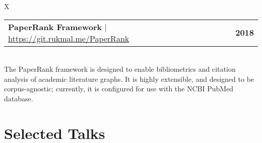 \documentclass[10pt]{article}
\newcommand{\tabularxwidth}{\textwidth}
\begin{document}
        \begin{tabularx}{\tabularxwidth}{X}
                {
                    \begin{tabularx}{\tabularxwidth}{@{}X r}
                        \textbf{PaperRank Framework}
                            | \url{https://git.rukmal.me/PaperRank}
                        &
                        \textbf{
        2018} \\
                    \end{tabularx}
                } \\

            

            
    The PaperRank framework is designed to enable bibliometrics and citation analysis of academic literature graphs. It is highly extensible, and designed to be corpus-agnostic; currently, it is configured for use with the NCBI PubMed database. \\

        \end{tabularx}

        

    

    \vspace{-0.5em}


    
        \section{Selected Talks}
        \vspace{-.5em}
\end{document}
